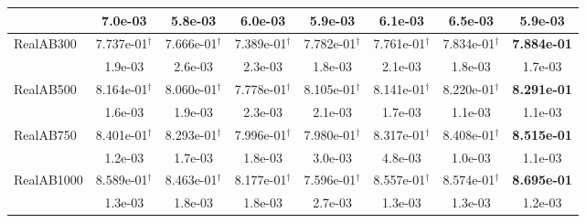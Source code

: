 {\begin{longtable}[c]{lccccccc}
               & 7.0e-03            & 5.8e-03            & 6.0e-03            & 5.9e-03            & 6.1e-03            & 6.5e-03                      & 5.9e-03            \\
    \midrule
    RealAB300      & 7.737e-01$^{\dag}$ & 7.666e-01$^{\dag}$ & 7.389e-01$^{\dag}$ & 7.782e-01$^{\dag}$ & 7.761e-01$^{\dag}$ & 7.834e-01$^{\dag}$ & \textbf{7.884e-01} \\
               & 1.9e-03            & 2.6e-03            & 2.3e-03            & 1.8e-03            & 2.1e-03            & 1.8e-03                   & 1.7e-03            \\
    \midrule
    RealAB500      & 8.164e-01$^{\dag}$ & 8.060e-01$^{\dag}$ & 7.778e-01$^{\dag}$ & 8.105e-01$^{\dag}$ & 8.141e-01$^{\dag}$ & 8.220e-01$^{\dag}$ & \textbf{8.291e-01} \\
               & 1.6e-03            & 1.9e-03            & 2.3e-03            & 2.1e-03            & 1.7e-03            & 1.1e-03                       & 1.1e-03            \\
    \midrule
    RealAB750      & 8.401e-01$^{\dag}$ & 8.293e-01$^{\dag}$ & 7.996e-01$^{\dag}$ & 7.980e-01$^{\dag}$ & 8.317e-01$^{\dag}$ & 8.408e-01$^{\dag}$     & \textbf{8.515e-01} \\
               & 1.2e-03            & 1.7e-03            & 1.8e-03            & 3.0e-03            & 4.8e-03            & 1.0e-03                       & 1.1e-03            \\
    \midrule
    RealAB1000      & 8.589e-01$^{\dag}$ & 8.463e-01$^{\dag}$ & 8.177e-01$^{\dag}$ & 7.596e-01$^{\dag}$ & 8.557e-01$^{\dag}$ & 8.574e-01$^{\dag}$  & \textbf{8.695e-01} \\
               & 1.3e-03            & 1.8e-03            & 1.8e-03            & 2.7e-03            & 1.3e-03            & 1.3e-03                    & 1.2e-03            \\
    \midrule


\end{longtable}}
